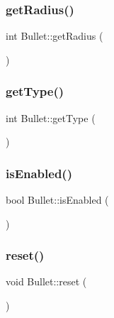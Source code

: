 \mbox{\label{class_bullet_a781ca8ccaf366435ece65eacd79e8b44}} 
\subsubsection{\texorpdfstring{get\+Radius()}{getRadius()}}
{\footnotesize\ttfamily int Bullet\+::get\+Radius (\begin{DoxyParamCaption}{ }\end{DoxyParamCaption})}

\mbox{\label{class_bullet_a73634149134359bca3f2201fb6284707}} 
\subsubsection{\texorpdfstring{get\+Type()}{getType()}}
{\footnotesize\ttfamily int Bullet\+::get\+Type (\begin{DoxyParamCaption}{ }\end{DoxyParamCaption})}

\mbox{\label{class_bullet_a459d9d3adb6bdd2899965e1916eafb49}} 
\subsubsection{\texorpdfstring{is\+Enabled()}{isEnabled()}}
{\footnotesize\ttfamily bool Bullet\+::is\+Enabled (\begin{DoxyParamCaption}{ }\end{DoxyParamCaption})}

\mbox{\label{class_bullet_af2e8a6860232266f180efbdb2a68f8c9}} 
\subsubsection{\texorpdfstring{reset()}{reset()}}
{\footnotesize\ttfamily void Bullet\+::reset (\begin{DoxyParamCaption}{ }\end{DoxyParamCaption})}

